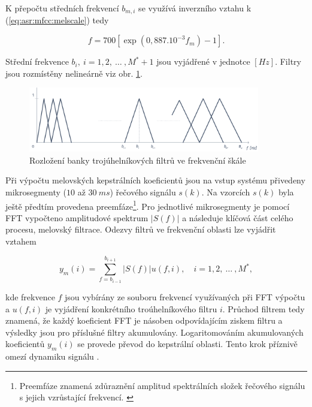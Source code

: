 \noindent K přepočtu středních frekvencí $b_{m,i}$ se využívá inverzního vztahu k (\ref{eq:asr:mfcc:melscale}) tedy

\begin{equation}
  f = 700 \left[ \exp\left( 0,887.10^{-3} f_m \right) - 1 \right].
  \label{eq:asr:mfcc:melscale:inverse}
\end{equation}

\noindent Střední frekvence $b_i,\ i=1,2,\ \dots\ , M^{*}+1$ jsou vyjádřené v jednotce $[Hz]$. Filtry jsou rozmístěny nelineárně viz obr. \ref{fig:asr:mfcc:bank:hz}.

\begin{figure}[hbpt]
  \centering
  \includegraphics[width=0.9\textwidth]{./ch4-asr/img/filter_bank-hz.pdf}
  \caption{Rozložení banky trojúhelníkových filtrů ve frekvenční škále}
  \label{fig:asr:mfcc:bank:hz}
\end{figure}

Při výpočtu melovských kepstrálních koeficientů jsou na vstup systému přivedeny mikrosegmenty ($10$ až $30\ ms$) řečového signálu $s(k)$. Na vzorcích $s(k)$ byla ještě předtím provedena preemfáze\footnote{Preemfáze znamená zdůraznění amplitud spektrálních složek řečového signálu s jejich vzrůstající frekvencí. \cite{Psutka2006}}. Pro jednotlivé mikrosegmenty je pomocí FFT vypočteno amplitudové spektrum $\left| S(f) \right|$ a následuje klíčová část celého procesu, melovský filtrace. Odezvy filtrů ve frekvenční oblasti lze vyjádřit vztahem

\begin{equation}
  y_m(i) = \sum_{f=b_{i-1}}^{b_{i+1}} \left| S(f) \right| u\left(f, i\right),  \quad i = 1, 2,\ \dots\ ,M^{*},
  \label{eq:asr:mfcc:freq:responce}
\end{equation}

\noindent kde frekvence $f$ jsou vybírány ze souboru frekvencí využívaných při FFT výpočtu a $u(f, i)$ je vyjádření konkrétního troúhelníkového filtru $i$. Průchod filtrem tedy znamená, že každý koeficient FFT je násoben odpovídajícím ziskem filtru a výsledky jsou pro příslušné filtry akumulovány. Logaritomováním akumulovaných koeficientů $y_{m}(i)$ se provede převod do kepstrální oblasti. Tento krok příznivě omezí dynamiku signálu \cite{Benesty2007}.

